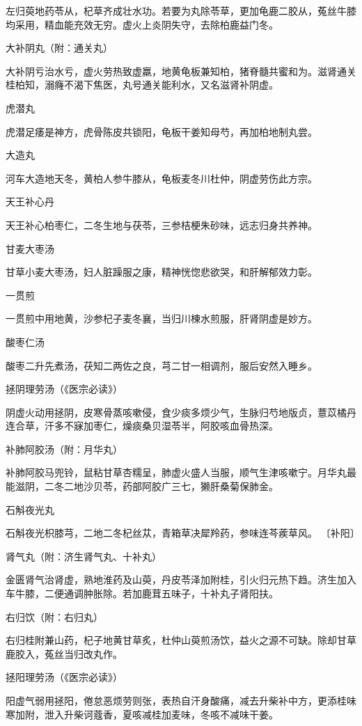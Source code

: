 \documentclass[a4paper,12pt,UTF8,twoside]{ctexbook}
\begin{document}
左归萸地药苓从，杞草齐成壮水功。若要为丸除苓草，更加龟鹿二胶从，菟丝牛膝均采用，精血能充效无穷。虚火上炎阴失守，去除柏鹿益门冬。

大补阴丸（附：通关丸）

大补阴亏治水亏，虚火劳热致虚羸，地黄龟板兼知柏，猪脊髓共蜜和为。滋肾通关桂柏知，溺癃不渴下焦医，丸号通关能利水，又名滋肾补阴虚。

虎潜丸

虎潜足痿是神方，虎骨陈皮共锁阳，龟板干姜知母芍，再加柏地制丸尝。

大造丸

河车大造地天冬，黄柏人参牛膝从，龟板麦冬川杜仲，阴虚劳伤此方宗。

天王补心丹

天王补心柏枣仁，二冬生地与茯苓，三参桔梗朱砂味，远志归身共养神。

甘麦大枣汤

甘草小麦大枣汤，妇人脏躁服之康，精神恍惚悲欲哭，和肝解郁效力彰。

一贯煎

一贯煎中用地黄，沙参杞子麦冬襄，当归川楝水煎服，肝肾阴虚是妙方。

酸枣仁汤

酸枣二升先煮汤，茯知二两佐之良，芎二甘一相调剂，服后安然入睡乡。

拯阴理劳汤（《医宗必读》）

阴虚火动用拯阴，皮寒骨蒸咳嗽侵，食少痰多烦少气，生脉归芍地版贞，薏苡橘丹连合草，汗多不寐加枣仁，燥痰桑贝湿苓半，阿胶咳血骨热深。

补肺阿胶汤（附：月华丸）

补肺阿胶马兜铃，鼠粘甘草杏糯呈，肺虚火盛人当服，顺气生津咳嗽宁。月华丸最能滋阴，二冬二地沙贝苓，药部阿胶广三七，獭肝桑菊保肺金。

石斛夜光丸

石斛夜光枳膝芎，二地二冬杞丝苁，青箱草决犀羚药，参味连芩蒺草风。
〔补阳〕

肾气丸（附：济生肾气丸、十补丸）

金匮肾气治肾虚，熟地淮药及山萸，丹皮苓泽加附桂，引火归元热下趋。济生加入车牛膝，二便通调肿胀除。若加鹿茸五味子，十补丸子肾阳扶。

右归饮（附：右归丸）

右归桂附兼山药，杞子地黄甘草炙，杜仲山萸煎汤饮，益火之源不可缺。除却甘草鹿胶入，菟丝当归改丸作。

拯阳理劳汤（《医宗必读》）

阳虚气弱用拯阳，倦怠恶烦劳则张，表热自汗身酸痛，减去升柴补中方，更添桂味寒加附，泄入升柴诃蔻香，夏咳减桂加麦味，冬咳不减味干姜。
\end{document}
